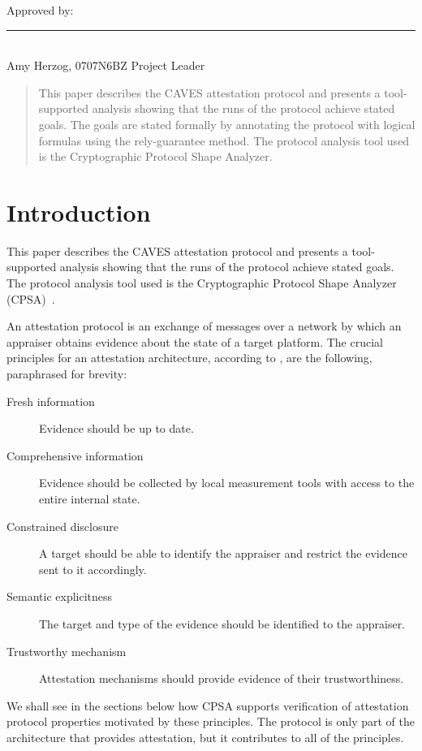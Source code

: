 \documentclass[titlepage,12pt]{article}
\theoremstyle{definition}
\begin{document}
\noindent
Approved by:\\[1in]
\rule{3in}{.3mm}\\
Amy Herzog, 0707N6BZ Project Leader

\clearpage

\fi

\begin{abstract}
This paper describes the CAVES attestation protocol and presents a
tool-supported analysis showing that the runs of the protocol achieve
stated goals.  The goals are stated formally by annotating the
protocol with logical formulas using the rely-guarantee method.  The
protocol analysis tool used is the Cryptographic Protocol Shape
Analyzer.
\end{abstract}

\tableofcontents
\section{Introduction}

This paper describes the CAVES attestation protocol and presents a
tool-supported analysis showing that the runs of the protocol achieve
stated goals.  The protocol analysis tool used is the Cryptographic
Protocol Shape Analyzer (CPSA)~\cite{cpsa09}.

An attestation protocol is an exchange of messages over a network by
which an appraiser obtains evidence about the state of a target
platform.  The crucial principles for an attestation architecture,
according to \cite{CokerAtEl08}, are the following, paraphrased for
brevity:
\begin{description}
\item[Fresh information] Evidence should be up to date.
\item[Comprehensive information] Evidence should be collected by local
measurement tools with access to the entire internal state.
\item[Constrained disclosure] A target should be able to identify the
appraiser and restrict the evidence sent to it accordingly.
\item[Semantic explicitness] The target and type of the evidence should
be identified to the appraiser.
\item[Trustworthy mechanism] Attestation mechanisms should provide
evidence of their trustworthiness.
\end{description}
We shall see in the sections below how CPSA supports verification of
attestation protocol properties motivated by these principles. The
protocol is only part of the architecture that provides attestation,
but it contributes to all of the principles.
\end{document}

